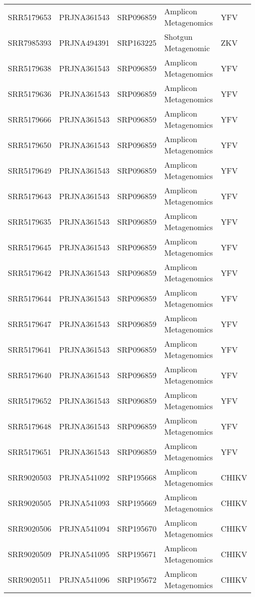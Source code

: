 \begin{scriptsize}
\begin{center}
\begin{longtable}{@{}lllll@{}}
SRR5179653 & PRJNA361543 & SRP096859 & Amplicon Metagenomics & YFV      \\
SRR7985393 & PRJNA494391 & SRP163225 & Shotgun Metagenomic   & ZKV      \\
SRR5179638 & PRJNA361543 & SRP096859 & Amplicon Metagenomics & YFV      \\
SRR5179636 & PRJNA361543 & SRP096859 & Amplicon Metagenomics & YFV      \\
SRR5179666 & PRJNA361543 & SRP096859 & Amplicon Metagenomics & YFV      \\
SRR5179650 & PRJNA361543 & SRP096859 & Amplicon Metagenomics & YFV      \\
SRR5179649 & PRJNA361543 & SRP096859 & Amplicon Metagenomics & YFV      \\
SRR5179643 & PRJNA361543 & SRP096859 & Amplicon Metagenomics & YFV      \\
SRR5179635 & PRJNA361543 & SRP096859 & Amplicon Metagenomics & YFV      \\
SRR5179645 & PRJNA361543 & SRP096859 & Amplicon Metagenomics & YFV      \\
SRR5179642 & PRJNA361543 & SRP096859 & Amplicon Metagenomics & YFV      \\
SRR5179644 & PRJNA361543 & SRP096859 & Amplicon Metagenomics & YFV      \\
SRR5179647 & PRJNA361543 & SRP096859 & Amplicon Metagenomics & YFV      \\
SRR5179641 & PRJNA361543 & SRP096859 & Amplicon Metagenomics & YFV      \\
SRR5179640 & PRJNA361543 & SRP096859 & Amplicon Metagenomics & YFV      \\
SRR5179652 & PRJNA361543 & SRP096859 & Amplicon Metagenomics & YFV      \\
SRR5179648 & PRJNA361543 & SRP096859 & Amplicon Metagenomics & YFV      \\
SRR5179651 & PRJNA361543 & SRP096859 & Amplicon Metagenomics & YFV      \\
SRR9020503 & PRJNA541092 & SRP195668 & Amplicon Metagenomics & CHIKV    \\
SRR9020505 & PRJNA541093 & SRP195669 & Amplicon Metagenomics & CHIKV    \\
SRR9020506 & PRJNA541094 & SRP195670 & Amplicon Metagenomics & CHIKV    \\
SRR9020509 & PRJNA541095 & SRP195671 & Amplicon Metagenomics & CHIKV    \\
SRR9020511 & PRJNA541096 & SRP195672 & Amplicon Metagenomics & CHIKV    \\

\end{longtable}
\end{center}
\end{scriptsize}
